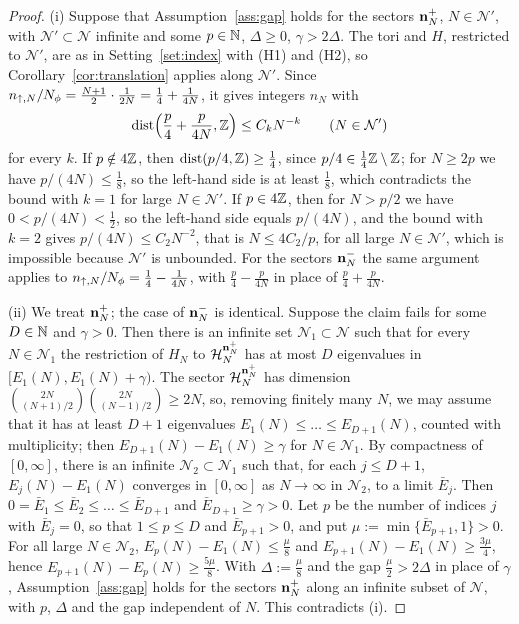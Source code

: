 \begin{proof}
(i) Suppose that Assumption~\ref{ass:gap} holds for the sectors $\mathbf{n}^+_N$, $N\in\mathcal N'$, with $\mathcal N'\subset\mathcal N$
infinite and some $p\in\mathbb{N}$, $\Delta\ge0$, $\gamma>2\Delta$. The tori and $H$, restricted to $\mathcal N'$, are as in
Setting~\ref{set:index} with (H1) and (H2), so Corollary~\ref{cor:translation} applies along $\mathcal N'$. Since
$n_{{\uparrow},N}/N_{\phi}=\frac{N+1}2\cdot\frac1{2N}=\frac14+\frac1{4N}$, it gives integers $n_N$ with
\[
\operatorname{dist}\Bigl(\frac p4+\frac p{4N},\mathbb{Z}\Bigr)\le C_kN^{-k}\qquad(N\in\mathcal N')
\]
for every $k$. If $p\notin4\mathbb{Z}$, then $\operatorname{dist}(p/4,\mathbb{Z})\ge\frac14$, since $p/4\in\frac14\mathbb{Z}\setminus\mathbb{Z}$; for $N\ge2p$ we have
$p/(4N)\le\frac18$, so the left-hand side is at least $\frac18$, which contradicts the bound with $k=1$ for large
$N\in\mathcal N'$. If $p\in4\mathbb{Z}$, then for $N>p/2$ we have $0<p/(4N)<\frac12$, so the left-hand side equals $p/(4N)$, and the
bound with $k=2$ gives $p/(4N)\le C_2N^{-2}$, that is $N\le4C_2/p$, for all large $N\in\mathcal N'$, which is impossible
because $\mathcal N'$ is unbounded. For the sectors $\mathbf{n}^-_N$ the same argument applies to
$n_{{\uparrow},N}/N_{\phi}=\frac14-\frac1{4N}$, with $\frac p4-\frac p{4N}$ in place of $\frac p4+\frac p{4N}$.

(ii) We treat $\mathbf{n}^+_N$; the case of $\mathbf{n}^-_N$ is identical. Suppose the claim fails for some $D\in\mathbb{N}$ and $\gamma>0$.
Then there is an infinite set $\mathcal N_1\subset\mathcal N$ such that for every $N\in\mathcal N_1$ the restriction of $H_N$ to
$\mathcal{H}_N^{\mathbf{n}^+_N}$ has at most $D$ eigenvalues in $[E_1(N),E_1(N)+\gamma)$. The sector $\mathcal{H}_N^{\mathbf{n}^+_N}$ has dimension
$\binom{2N}{(N+1)/2}\binom{2N}{(N-1)/2}\ge2N$, so, removing finitely many $N$, we may assume that it has at least $D+1$
eigenvalues $E_1(N)\le\dots\le E_{D+1}(N)$, counted with multiplicity; then $E_{D+1}(N)-E_1(N)\ge\gamma$ for
$N\in\mathcal N_1$. By compactness of $[0,\infty]$, there is an infinite $\mathcal N_2\subset\mathcal N_1$ such that, for each
$j\le D+1$, $E_j(N)-E_1(N)$ converges in $[0,\infty]$ as $N\to\infty$ in $\mathcal N_2$, to a limit $\bar E_j$. Then
$0=\bar E_1\le\bar E_2\le\dots\le\bar E_{D+1}$ and $\bar E_{D+1}\ge\gamma>0$. Let $p$ be the number of indices $j$ with
$\bar E_j=0$, so that $1\le p\le D$ and $\bar E_{p+1}>0$, and put $\mu:=\min\{\bar E_{p+1},1\}>0$. For all large
$N\in\mathcal N_2$, $E_p(N)-E_1(N)\le\frac\mu8$ and $E_{p+1}(N)-E_1(N)\ge\frac{3\mu}4$, hence $E_{p+1}(N)-E_p(N)\ge\frac{5\mu}8$.
With $\Delta:=\frac\mu8$ and the gap $\frac\mu2>2\Delta$ in place of $\gamma$, Assumption~\ref{ass:gap} holds for the
sectors $\mathbf{n}^+_N$ along an infinite subset of $\mathcal N$, with $p$, $\Delta$ and the gap independent of $N$. This
contradicts (i).
\end{proof}

